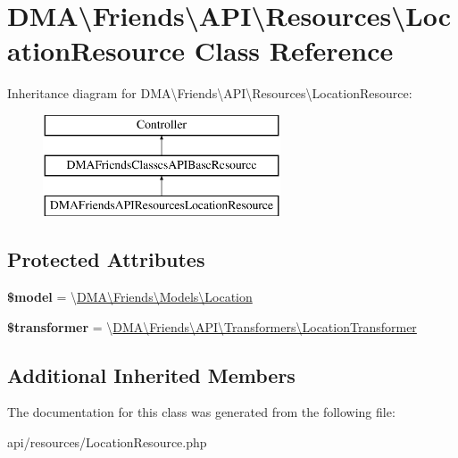 \hypertarget{classDMA_1_1Friends_1_1API_1_1Resources_1_1LocationResource}{}\section{D\+M\+A\textbackslash{}Friends\textbackslash{}A\+P\+I\textbackslash{}Resources\textbackslash{}Location\+Resource Class Reference}
\label{classDMA_1_1Friends_1_1API_1_1Resources_1_1LocationResource}
Inheritance diagram for D\+M\+A\textbackslash{}Friends\textbackslash{}A\+P\+I\textbackslash{}Resources\textbackslash{}Location\+Resource\+:\begin{figure}[H]
\begin{center}
\leavevmode
\includegraphics[height=3.000000cm]{db/dd4/classDMA_1_1Friends_1_1API_1_1Resources_1_1LocationResource}
\end{center}
\end{figure}
\subsection*{Protected Attributes}
\begin{DoxyCompactItemize}
\item 
\hypertarget{classDMA_1_1Friends_1_1API_1_1Resources_1_1LocationResource_ae4d7f186fb802f25b5f59537c9b3610d}{}{\bfseries \$model} = \textquotesingle{}\textbackslash{}\hyperlink{classDMA_1_1Friends_1_1Models_1_1Location}{D\+M\+A\textbackslash{}\+Friends\textbackslash{}\+Models\textbackslash{}\+Location}\textquotesingle{}\label{classDMA_1_1Friends_1_1API_1_1Resources_1_1LocationResource_ae4d7f186fb802f25b5f59537c9b3610d}

\item 
\hypertarget{classDMA_1_1Friends_1_1API_1_1Resources_1_1LocationResource_aa741da20ae567f632ffe4abd673e7cdb}{}{\bfseries \$transformer} = \textquotesingle{}\textbackslash{}\hyperlink{classDMA_1_1Friends_1_1API_1_1Transformers_1_1LocationTransformer}{D\+M\+A\textbackslash{}\+Friends\textbackslash{}\+A\+P\+I\textbackslash{}\+Transformers\textbackslash{}\+Location\+Transformer}\textquotesingle{}\label{classDMA_1_1Friends_1_1API_1_1Resources_1_1LocationResource_aa741da20ae567f632ffe4abd673e7cdb}

\end{DoxyCompactItemize}
\subsection*{Additional Inherited Members}


The documentation for this class was generated from the following file\+:\begin{DoxyCompactItemize}
\item 
api/resources/Location\+Resource.\+php\end{DoxyCompactItemize}
